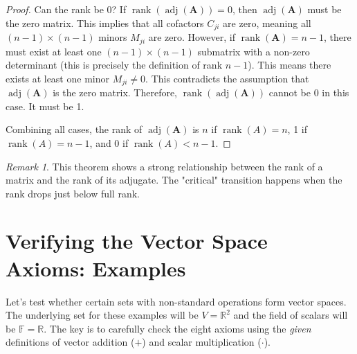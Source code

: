 \documentclass[11pt]{article}
\theoremstyle{definition}
\theoremstyle{remark}
\newtheorem{remark}[theorem]{Remark}
\newcommand{\field}[1]{\mathbb{#1}} %
\newcommand{\R}{\field{R}}
\newcommand{\F}{\field{F}} %
\DeclareMathOperator{\rank}{rank}
\DeclareMathOperator{\adj}{adj}
\newcommand{\mat}[1]{\mathbf{#1}} %
\begin{document}
\begin{proof}
Can the rank be 0? If $\rank(\adj(\mat{A})) = 0$, then $\adj(\mat{A})$ must be the zero matrix. This implies that all cofactors $C_{ji}$ are zero, meaning all $(n-1) \times (n-1)$ minors $M_{ji}$ are zero. However, if $\rank(\mat{A}) = n-1$, there must exist at least one $(n-1) \times (n-1)$ submatrix with a non-zero determinant (this is precisely the definition of rank $n-1$). This means there exists at least one minor $M_{ji} \neq 0$. This contradicts the assumption that $\adj(\mat{A})$ is the zero matrix.
Therefore, $\rank(\adj(\mat{A}))$ cannot be 0 in this case. It must be 1.

Combining all cases, the rank of $\adj(\mat{A})$ is $n$ if $\rank(A)=n$, 1 if $\rank(A)=n-1$, and 0 if $\rank(A)<n-1$.
\end{proof}

\begin{remark}
This theorem shows a strong relationship between the rank of a matrix and the rank of its adjugate. The "critical" transition happens when the rank drops just below full rank.
\end{remark}

\section{Verifying the Vector Space Axioms: Examples}

Let's test whether certain sets with non-standard operations form vector spaces. The underlying set for these examples will be $V = \R^2$ and the field of scalars will be $\F = \R$. The key is to carefully check the eight axioms using the \emph{given} definitions of vector addition ($+$) and scalar multiplication ($\cdot$).
\end{document}
